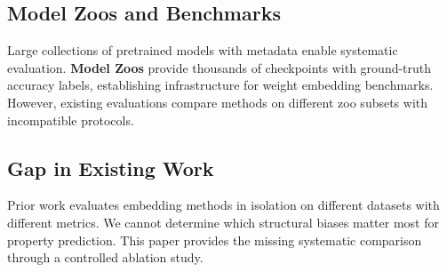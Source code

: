 \subsection{Model Zoos and Benchmarks}

Large collections of pretrained models with metadata enable systematic evaluation. \textbf{Model Zoos} \cite{schurholt2022model} provide thousands of checkpoints with ground-truth accuracy labels, establishing infrastructure for weight embedding benchmarks. However, existing evaluations compare methods on different zoo subsets with incompatible protocols.

\subsection{Gap in Existing Work}

Prior work evaluates embedding methods in isolation on different datasets with different metrics. We cannot determine which structural biases matter most for property prediction. This paper provides the missing systematic comparison through a controlled ablation study.
